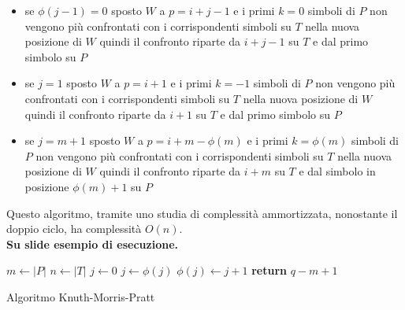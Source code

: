 \documentclass[a4paper,12pt, oneside]{book}
\begin{document}
\begin{itemize}
  \item se $\phi(j-1)=0$ sposto $W$ a $p=i+j-1$ e i primi $k=0$ simboli di $P$
  non vengono più confrontati con i corrispondenti simboli su $T$ nella nuova
  posizione di $W$ quindi il confronto riparte da $i+j-1$ su $T$ e dal primo
  simbolo su $P$
  \item se $j=1$ sposto $W$ a $p=i+1$ e i primi $k=-1$ simboli di $P$
  non vengono più confrontati con i corrispondenti simboli su $T$ nella nuova
  posizione di $W$ quindi il confronto riparte da $i+1$ su $T$ e dal primo
  simbolo su $P$
  \item se $j=m+1$ sposto $W$ a $p=i+m-\phi(m)$ e i primi $k=\phi(m)$ simboli di
  $P$ 
  non vengono più confrontati con i corrispondenti simboli su $T$ nella nuova
  posizione di $W$ quindi il confronto riparte da $i+m$ su $T$ e dal 
  simbolo in posizione $\phi(m)+1$ su $P$
\end{itemize}

Questo algoritmo, tramite uno studia di complessità ammortizzata, nonostante il
doppio ciclo, ha complessità $O(n)$.\\
\textbf{Su slide esempio di esecuzione.}
\begin{algorithm}
  \begin{algorithmic}
    \State $m\gets |P|$
    \State $n\gets |T|$
    \State $j\gets 0$
    \State $j \gets \phi(j)$
    \EndWhile
    \State $\phi(j)\gets j+1$
    \State \textbf{return} $q-m+1$
    \EndIf
    \EndFor   
    \EndFunction
  \end{algorithmic}
  \caption{Algoritmo Knuth-Morris-Pratt}
\end{algorithm}
\end{document}
